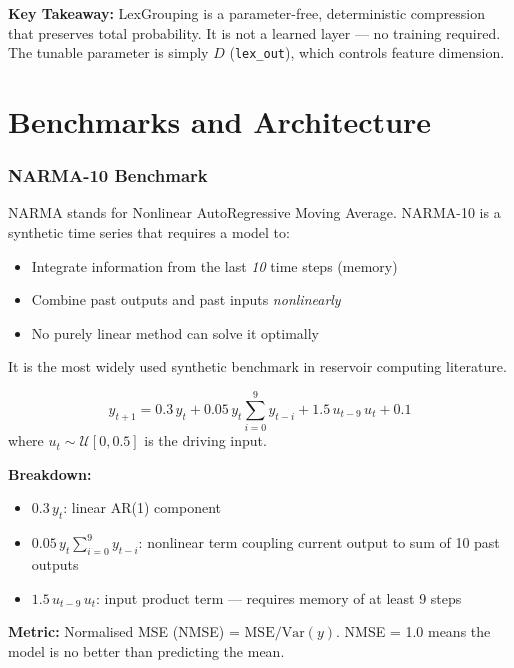 \documentclass[11pt]{article}
\newcommand{\concept}[2]{%
  \begin{tcolorbox}[conceptbox, title={#1}]
  #2
  \end{tcolorbox}
}
\newcommand{\mathblock}[2]{%
  \begin{tcolorbox}[mathbox, title={Math: #1}]
  #2
  \end{tcolorbox}
}
\newcommand{\keypoint}[1]{%
  \begin{tcolorbox}[keybox]
  \textbf{Key Takeaway:} #1
  \end{tcolorbox}
}
\begin{document}
\keypoint{LexGrouping is a parameter-free, deterministic compression that
preserves total probability. It is not a learned layer --- no training
required. The tunable parameter is simply $D$ (\texttt{lex\_out}), which
controls feature dimension.}

\clearpage
\part{Benchmarks and Architecture}

\section{NARMA-10 Benchmark}

\concept{A Nonlinear Memory Challenge}{
NARMA stands for Nonlinear AutoRegressive Moving Average. NARMA-10 is a
synthetic time series that requires a model to:
\begin{itemize}
  \item Integrate information from the last \emph{10} time steps (memory)
  \item Combine past outputs and past inputs \emph{nonlinearly}
  \item No purely linear method can solve it optimally
\end{itemize}
It is the most widely used synthetic benchmark in reservoir computing literature.
}

\mathblock{Exact NARMA-10 Formula}{
\[
  y_{t+1} = 0.3\, y_t + 0.05\, y_t \sum_{i=0}^{9} y_{t-i}
           + 1.5\, u_{t-9}\, u_t + 0.1
\]
where $u_t \sim \mathcal{U}[0, 0.5]$ is the driving input.

\textbf{Breakdown:}
\begin{itemize}
  \item $0.3\, y_t$: linear AR(1) component
  \item $0.05\, y_t \sum_{i=0}^{9} y_{t-i}$: nonlinear term coupling
        current output to sum of 10 past outputs
  \item $1.5\, u_{t-9}\, u_t$: input product term --- requires memory
        of at least 9 steps
\end{itemize}

\textbf{Metric:} Normalised MSE (NMSE) = $\text{MSE}/\text{Var}(y)$.
NMSE = 1.0 means the model is no better than predicting the mean.
}
\end{document}
